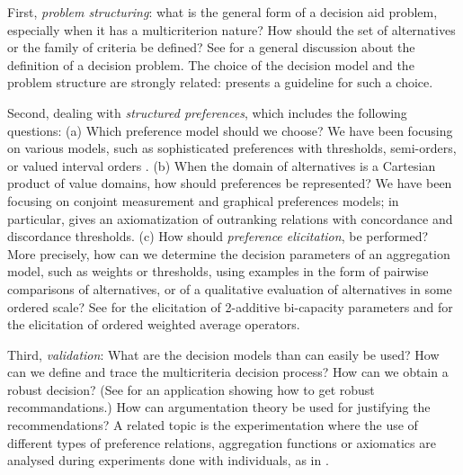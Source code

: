 First, {\em problem structuring}: what is the general form of a decision aid problem, especially when it has a multicriterion nature? How should the set of alternatives or the family of criteria be defined? See \cite{Colorni2013What-1223003} for a general discussion about the definition of a decision problem. 
The choice of the decision model and the problem structure are strongly related: \cite{Figueira2013An-623281} presents a guideline for such a choice. 

Second, dealing with {\em structured preferences}, which includes the following questions: (a) Which preference model should we choose? We have been focusing on various models, such as  sophisticated preferences with thresholds, semi-orders, or valued interval orders \cite{Ozturk2015A-964395}. (b) When the domain of alternatives is a Cartesian product of value domains, how should preferences be represented? We have been focusing on conjoint measurement and graphical preferences models; in particular, \cite{Bouyssou2015A-634565} gives an axiomatization of outranking relations with concordance and discordance thresholds.
(c) How should {\em preference elicitation}, be performed? More precisely, how can we determine the decision parameters of an aggregation model, such as weights or thresholds, using examples in the form of pairwise comparisons of alternatives, or of a qualitative evaluation of alternatives in some ordered scale? See \cite{Rolland2015Elicitation-636304} for the elicitation of 2-additive bi-capacity parameters and \cite{Labreuche2015Extension-634557} for the elicitation of ordered weighted average operators. 

Third, {\em validation}: 
What are the decision models than can easily be used? How can we define and trace the multicriteria decision process? How can we obtain a robust decision? (See \cite{BotteroFFGR15} for an application showing how to get robust recommandations.) How can argumentation theory be used for justifying the recommendations? A related topic is the experimentation where the use of different types of preference relations, aggregation functions or axiomatics are analysed during experiments done with individuals, as in
 \cite{Deparis2015The-921683}.

